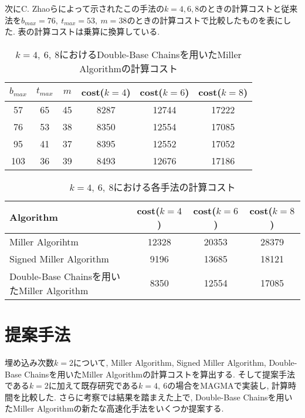 \clearpage
次にC. Zhaoらによって示されたこの手法の$k=4,6,8$のときの計算コストと従来法を$b_{max} = 76,\ t_{max} = 53,\ m = 38$のときの計算コストで比較したものを表にした. 表の計算コストは乗算に換算している. 
\begin{table}[htbp]
 \begin{center}
  \begin{tabular}{|c|c|c|c|c|c|}
  \hline
  $b_{max}$ & $t_{max}$ & $m$ & cost($k=4$) & cost($k=6$) & cost($k=8$) \\
  \hline
  57 & 65 & 45 & 8287 & 12744 & 17222 \\
  \hline
  76 & 53 & 38 & 8350 & 12554 & 17085 \\
  \hline
  95 & 41 & 37 & 8395 & 12552 & 17052 \\
  \hline
  103 & 36 & 39 & 8493 & 12676 & 17186 \\
  \hline
  \end{tabular}
 \end{center}
 \caption{$k=4,\ 6,\ 8$におけるDouble-Base Chainsを用いたMiller Algorithmの計算コスト}
\end{table}
\begin{table}[htbp]
 \begin{center}
  \begin{tabular}{|l|c|c|c|}
  \hline
  Algorithm & cost($k=4$) & cost($k=6$) & cost($k=8$) \\
  \hline
  Miller Algorihtm & 12328 & 20353 & 28379 \\
  \hline
  Signed Miller Algorithm & 9196 & 13685 & 18121 \\
  \hline
  Double-Base Chainsを用いたMiller Algorithm & 8350 & 12554 & 17085 \\
  \hline
  \end{tabular}
 \end{center}
 \caption{$k=4,\ 6,\ 8$における各手法の計算コスト}
\end{table}
\section{提案手法}
埋め込み次数$k=2$について, Miller Algorithm, Signed Miller Algorithm, Double-Base Chainsを用いたMiller Algorithmの計算コストを算出する. そして提案手法である$k=2$に加えて既存研究である$k=4,\ 6$の場合をMAGMAで実装し, 計算時間を比較した. さらに考察では結果を踏まえた上で, Double-Base Chainsを用いたMiller Algorithmの新たな高速化手法をいくつか提案する. 